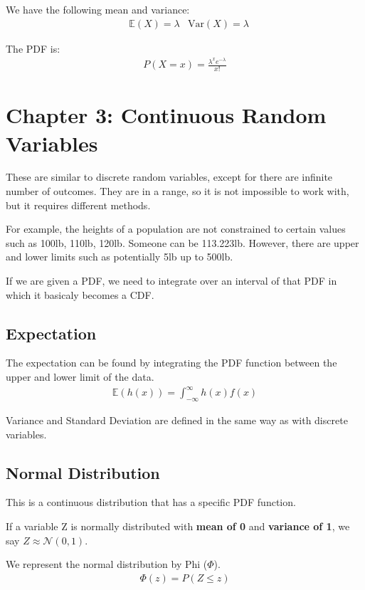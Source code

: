\documentclass[12pt,letterpaper]{article} \usepackage{amsmath} \usepackage{graphicx} \usepackage[margin=1in]{geometry} \usepackage{longtable}  \usepackage{amssymb}
\begin{document}
	We have the following mean and variance:
	\begin{align*}
		&\mathbb E(X) =\lambda &\text{Var}(X) = \lambda
	\end{align*}

	The PDF is:
	\begin{align*}
		P(X=x) = \frac{\lambda^xe^{-\lambda}}{x!}
	\end{align*}
	
	\section{Chapter 3: Continuous Random Variables}
	These are similar to discrete random variables, except for there are infinite number of outcomes. They are in a range, so it is not impossible to work with, but it requires different methods.
	
	For example, the heights of a population are not constrained to certain values such as 100lb, 110lb, 120lb. Someone can be 113.223lb. However, there are upper and lower limits such as potentially 5lb up to 500lb.
	
	If we are given a PDF, we need to integrate over an interval of that PDF in which it basicaly becomes a CDF. 
	
	\subsection{Expectation}
	The expectation can be found by integrating the PDF function between the upper and lower limit of the data. 
	\begin{align*}
		\mathbb E(h(x)) = \int_{-\infty}^{\infty}h(x)f(x)
	\end{align*}

	Variance and Standard Deviation are defined in the same way as with discrete variables. 
	
	\subsection{Normal Distribution}
	This is a continuous distribution that has a specific PDF function.
	
	If a variable Z is normally distributed with \textbf{mean of 0} and \textbf{variance of 1}, we say $Z \approx \mathcal{N}(0,1)$.
	
	We represent the normal distribution by Phi ($\Phi$). 
	\begin{align*}
		\Phi(z) = P(Z\le z)
	\end{align*}
\end{document}
